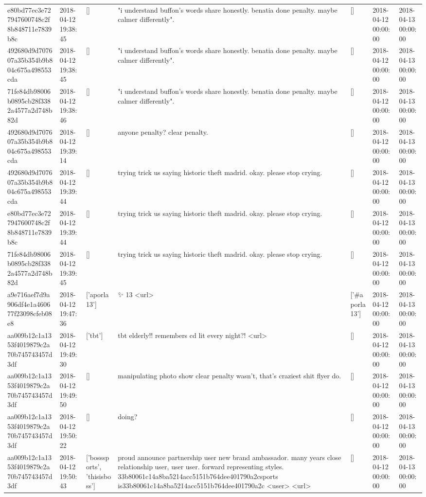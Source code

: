 \begin{tabular}{lllllll}
e80bd77ec3e727947600748c2f8b848711e7839b8c & 2018-04-12 19:38:45 & [] & "i understand buffon's words share honestly. benatia done penalty. maybe calmer differently". & [] & 2018-04-12 00:00:00 & 2018-04-13 00:00:00 \\
492680d9d707607a35b354b9b804c675a498553cda & 2018-04-12 19:38:45 & [] & "i understand buffon's words share honestly. benatia done penalty. maybe calmer differently". & [] & 2018-04-12 00:00:00 & 2018-04-13 00:00:00 \\
71fe84db98006b0895cb28f3382a4577a2d748b82d & 2018-04-12 19:38:46 & [] & "i understand buffon's words share honestly. benatia done penalty. maybe calmer differently". & [] & 2018-04-12 00:00:00 & 2018-04-13 00:00:00 \\
492680d9d707607a35b354b9b804c675a498553cda & 2018-04-12 19:39:14 & [] & anyone penalty? clear penalty. & [] & 2018-04-12 00:00:00 & 2018-04-13 00:00:00 \\
492680d9d707607a35b354b9b804c675a498553cda & 2018-04-12 19:39:44 & [] & trying trick us saying historic theft madrid. okay. please stop crying. & [] & 2018-04-12 00:00:00 & 2018-04-13 00:00:00 \\
e80bd77ec3e727947600748c2f8b848711e7839b8c & 2018-04-12 19:39:44 & [] & trying trick us saying historic theft madrid. okay. please stop crying. & [] & 2018-04-12 00:00:00 & 2018-04-13 00:00:00 \\
71fe84db98006b0895cb28f3382a4577a2d748b82d & 2018-04-12 19:39:45 & [] & trying trick us saying historic theft madrid. okay. please stop crying. & [] & 2018-04-12 00:00:00 & 2018-04-13 00:00:00 \\
a9e716aef7d9a906df4e1a460677f23098cfeb08e8 & 2018-04-12 19:47:36 & ['aporla13'] & ✨ 13 <url> & ['#aporla13'] & 2018-04-12 00:00:00 & 2018-04-13 00:00:00 \\
aa009b12c1a1353f4019879c2a70b745743457d3df & 2018-04-12 19:49:30 & ['tbt'] & tbt elderly!! remembers cd lit every night?! <url> & [] & 2018-04-12 00:00:00 & 2018-04-13 00:00:00 \\
aa009b12c1a1353f4019879c2a70b745743457d3df & 2018-04-12 19:49:50 & [] & manipulating photo show clear penalty wasn't, that's craziest shit flyer do. & [] & 2018-04-12 00:00:00 & 2018-04-13 00:00:00 \\
aa009b12c1a1353f4019879c2a70b745743457d3df & 2018-04-12 19:50:22 & [] & doing? & [] & 2018-04-12 00:00:00 & 2018-04-13 00:00:00 \\
aa009b12c1a1353f4019879c2a70b745743457d3df & 2018-04-12 19:50:43 & ['bosssports', 'thisisboss'] & proud announce partnership user new brand ambassador. many years close relationship user, user user. forward representing styles. 33b80061c14a8ba5214acc5151b764dee401790a2csports is33b80061c14a8ba5214acc5151b764dee401790a2c <user> <url> & [] & 2018-04-12 00:00:00 & 2018-04-13 00:00:00 \\

\end{tabular}
